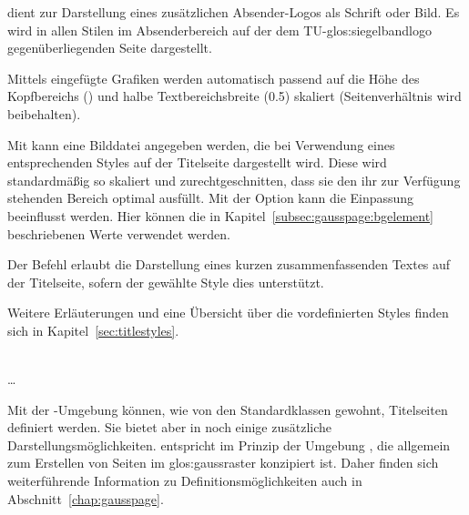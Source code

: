 \begin{minipage}[t]{0.6\textwidth}
   dient zur Darstellung eines zusätzlichen Absender-Logos als Schrift
  oder Bild. Es wird in allen Stilen im Absenderbereich auf der dem
  TU-\gls{glos:siegelbandlogo} gegenüberliegenden Seite dargestellt.
  
  Mittels  eingefügte Grafiken werden automatisch
  passend auf die Höhe des Kopfbereichs () und
  halbe Textbereichsbreite (0.5) skaliert
  (Seitenverhältnis wird beibehalten).
\end{minipage}
\hfill
\begin{minipage}[t]{0.3\textwidth}
  \vspace*{-1ex}%
\end{minipage}

Mit  kann eine Bilddatei angegeben werden, die bei
Verwendung eines entsprechenden Styles auf der Titelseite dargestellt wird.
Diese wird standardmäßig so skaliert und zurechtgeschnitten, dass sie den ihr
zur Verfügung stehenden Bereich optimal ausfüllt.
Mit der Option  kann die Einpassung beeinflusst werden.
Hier können die in Kapitel~\ref{subsec:gausspage:bgelement} beschriebenen Werte
verwendet werden.

Der Befehl  erlaubt die Darstellung eines kurzen
zusammenfassenden Textes auf der Titelseite, sofern der gewählte Style
dies unterstützt.

Weitere Erläuterungen und eine Übersicht über die vordefinierten Styles
finden sich in Kapitel~\ref{sec:titlestyles}.


\begin{Declaration}
  \\
  \quad\dots\\
\end{Declaration}

Mit der -Umgebung können, wie von den Standardklassen
gewohnt, Titelseiten definiert werden. Sie bietet aber in \tubslatex noch einige
zusätzliche Darstellungsmöglichkeiten.  entspricht
im Prinzip der Umgebung , die allgemein zum Erstellen
von Seiten im \gls{glos:gaussraster} konzipiert ist. Daher finden sich
weiterführende Information zu Definitionsmöglichkeiten auch in
Abschnitt~\ref{chap:gausspage}.

